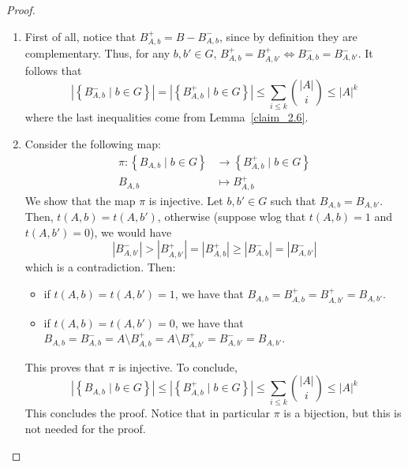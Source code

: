         \begin{proof}
        \begin{enumerate}
            \item First of all, notice that $B^+_{A,b} = B - B^-_{A,b}$, since by definition they are complementary.
                Thus, for any $b, b' \in G$, $B^+_{A,b} = B^+_{A,b'} \Leftrightarrow B^-_{A,b} = B^-_{A,b'}$.
                It follows that
                $$
                    \left| \left\{ B^-_{A,b} \mid b \in G \right\} \right| =
                    \left| \left\{ B^+_{A,b} \mid b \in G \right\} \right| \leq
                    \sum_{i \leq k} \binom{|A|}{i} \leq |A|^k
                $$
                where the last inequalities come from Lemma~\ref{claim_2.6}.
            \item Consider the following map:
                \begin{align*}
                    \pi: \left\{ B_{A,b} \mid b \in G \right\} & \longrightarrow \left\{ B^+_{A,b} \mid b \in G \right\} \\
                                                       B_{A,b} & \longmapsto B^+_{A,b}
                \end{align*}
                We show that the map $\pi$ is injective.
                Let $b,b' \in G$ such that $B_{A,b} = B_{A,b'}$.
                Then, $t(A,b) = t(A,b')$, otherwise (suppose wlog that $t(A,b) = 1$ and $t(A,b') = 0$), we would have
                $$
                    \left| B^-_{A,b'} \right| > \left| B^+_{A,b'} \right| = \left| B^+_{A,b} \right| \geq
                        \left| B^-_{A,b} \right| = \left| B^-_{A,b'} \right|
                $$
                which is a contradiction.
                Then:
                \begin{itemize}
                    \item if $t(A,b) = t(A,b') = 1$, we have that $B_{A,b} = B^+_{A,b} = B^+_{A,b'} = B_{A,b'}$.
                    \item if $t(A,b) = t(A,b') = 0$, we have that
                    $B_{A,b} = B^-_{A,b} = A \setminus B^+_{A,b} = A \setminus B^+_{A,b'} = B^-_{A,b'} = B_{A,b'}$.
                \end{itemize}
                This proves that $\pi$ is injective.
                To conclude,
                $$
                    \left| \left\{ B_{A,b} \mid b \in G \right\} \right| \leq
                    \left| \left\{ B^+_{A,b} \mid b \in G \right\} \right| \leq
                    \sum_{i \leq k} \binom{|A|}{i} \leq |A|^k
                $$
                This concludes the proof.
                Notice that in particular $\pi$ is a bijection, but this is not needed for the proof.
        \end{enumerate}
        \end{proof}

